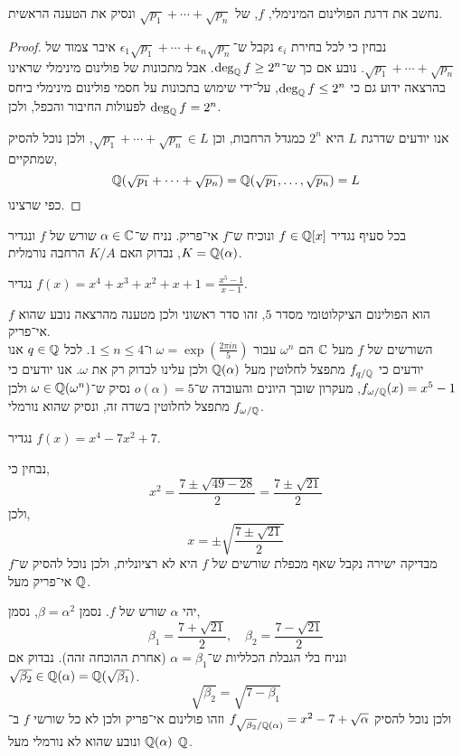 \subquestion{}
נחשב את דרגת הפולינום המינימלי, $f$, של $\sqrt{p_1} + \cdots + \sqrt{p_n}$ ונסיק את הטענה הראשית.
\begin{proof}
	נבחין כי לכל בחירת $\epsilon_i$ נקבל ש־$\epsilon_1 \sqrt{p_1} + \cdots + \epsilon_n \sqrt{p_n}$ איבר צמוד של $\sqrt{p_1} + \cdots + \sqrt{p_n}$.
	נובע אם כך ש־$\deg_{\mathbb{Q}} f \ge 2^n$.
	אבל מתכונות של פולינום מינימלי שראינו בהרצאה ידוע גם כי $\deg_{\mathbb{Q}} f \le 2^n$, על־ידי שימוש בתכונות על חסמי פולינום מינימלי ביחס לפעולות החיבור והכפל, ולכן $\deg_{\mathbb{Q}} f = 2^n$.

	אנו יודעים שדרגת $L$ היא $2^n$ כמגדל הרחבות, וכן $\sqrt{p_1} + \cdots + \sqrt{p_n} \in L$, ולכן נוכל להסיק שמתקיים,
	\[
		\mathbb{Q}(\sqrt{p_1} + \cdots + \sqrt{p_n})
		= \mathbb{Q}(\sqrt{p_1}, \ldots, \sqrt{p_n}) = L
	\]
	כפי שרצינו.
\end{proof}

\question{}
בכל סעיף נגדיר $f \in \mathbb{Q}[x]$ ונוכיח ש־$f$ אי־פריק.
נניח ש־$\alpha \in \mathbb{C}$ שורש של $f$ ונגדיר $K = \mathbb{Q}(\alpha)$, נבדוק האם $K / A$ הרחבה נורמלית.

\subquestion{}
נגדיר $f(x) = x^4 + x^3 + x^2 + x + 1 = \frac{x^5 - 1}{x - 1}$.
\begin{solution}
	$f$ הוא הפולינום הציקלוטומי מסדר $5$, זהו סדר ראשוני ולכן מטענה מהרצאה נובע שהוא אי־פריק. \\
	השורשים של $f$ מעל $\mathbb{C}$ הם $\omega^n$ עבור $\omega = \exp(\frac{2\pi i n}{5})$ ו־$1 \le n \le 4$.
	לכל $q \in \mathbb{Q}$ אנו יודעים כי $f_{q / \mathbb{Q}}$ מתפצל לחלוטין מעל $\mathbb{Q}(\alpha)$ ולכן עלינו לבדוק רק את $\omega$.
	אנו יודעים כי $f_{\omega / \mathbb{Q}}(x) = x^5 - 1$, מעקרון שובך היונים והעובדה ש־$o(\alpha) = 5$ נסיק ש־$\omega \in \mathbb{Q}(\omega^n)$ ולכן $f_{\omega / \mathbb{Q}}$ מתפצל לחלוטין בשדה זה, ונסיק שהוא נורמלי.
\end{solution}

\subquestion{}
נגדיר $f(x) = x^4 - 7x^2 + 7$.
\begin{solution}
	נבחין כי,
	\[
		x^2
		= \frac{7 \pm \sqrt{49 - 28}}{2}
		= \frac{7 \pm \sqrt{21}}{2}
	\]
	ולכן,
	\[
		x = \pm \sqrt{\frac{7 \pm \sqrt{21}}{2}}
	\]
	מבדיקה ישירה נקבל שאף מכפלת שורשים של $f$ היא לא רציונלית, ולכן נוכל להסיק ש־$f$ אי־פריק מעל $\mathbb{Q}$.

	יהי $\alpha$ שורש של $f$.
	נסמן $\beta = \alpha^2$, נסמן,
	\[
		\beta_1 = \frac{7 + \sqrt{21}}{2},
		\quad
		\beta_2 = \frac{7 - \sqrt{21}}{2}
	\]
	ונניח בלי הגבלת הכלליות ש־$\alpha = \beta_1$ (אחרת ההוכחה זהה).
	נבדוק אם $\sqrt{\beta_2} \in \mathbb{Q}(\alpha) = \mathbb{Q}(\sqrt{\beta_1})$.
	\[
		\sqrt{\beta_2}
		= \sqrt{7 - \beta_1}
	\]
	ולכן נוכל להסיק $f_{\sqrt{\beta_2} / \mathbb{Q}(\alpha)} = x^2 - 7 + \sqrt{\alpha}$ וזהו פולינום אי־פריק ולכן לא כל שורשי $f$ ב־$\mathbb{Q}(\alpha)$ ונובע שהוא לא נורמלי מעל $\mathbb{Q}$.
\end{solution}

